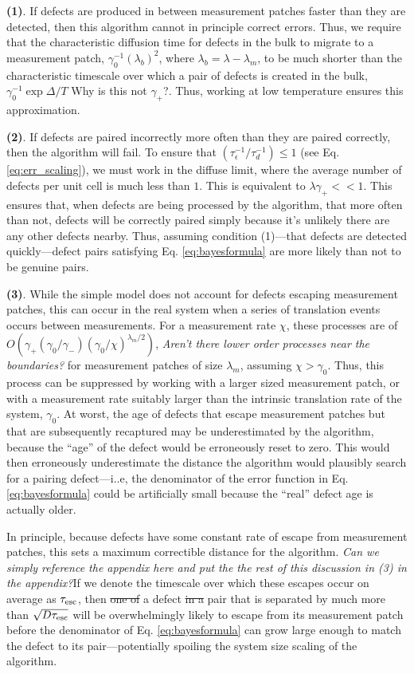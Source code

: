 \documentclass[twocolumn,superscriptaddress,aps,prb,floatfix]{revtex4-1}
\newcommand{\te}{\tau_{\rm{esc}}}
\newcommand{\CMH}[1]{{\color{green} { #1}}}
\newcommand{\MS}[1]{{\color{mauve} {#1}}}
\begin{document}
 \textbf{(1)}. If defects are produced in between measurement patches faster than they are detected, then this algorithm cannot in principle correct errors.  Thus, we require that the characteristic diffusion time for defects in the bulk to migrate to a measurement patch, $\gamma_0^{-1}(\lambda_b)^2$, \MS{where $\lambda_b=\lambda-\lambda_m$}, to be much shorter than the characteristic timescale over which a pair of defects is created in the bulk, $\gamma_0^{-1} \exp{\Delta/T}$ \MS{Why is this not $\gamma_+$?}.  Thus, working at low temperature ensures this approximation.
 
 \textbf{(2)}. If defects are paired incorrectly more often than they are paired correctly, then the algorithm will fail.  To ensure that $(\tau_{\epsilon}^{-1} / \tau_d^{-1})\leq1$ (see Eq. \ref{eq:err_scaling}), we must work in the diffuse limit, where the average number of defects per unit cell is much less than $1$.  This is equivalent to $\lambda \gamma_+<<1$.  This ensures that, when defects are being processed by the algorithm, that more often than not, defects will be correctly paired simply because it's unlikely there are any other defects nearby.  Thus, assuming condition (1)---that defects are detected quickly---defect pairs satisfying Eq. \ref{eq:bayesformula} are more likely than not to be genuine pairs. 
 
 \textbf{(3)}. While the simple model does not account for defects escaping measurement patches, this can occur in the real system when a series of translation events occurs between measurements.  For a measurement rate $\chi$, these processes are of $O(\gamma_+ (\gamma_0/\gamma_-) (\gamma_0/\chi)^{\lambda_m/2})$, \CMH{\it{Aren't there lower order processes near the boundaries?}} for measurement patches of size $\lambda_m$, assuming $\chi > \gamma_0$.  Thus, this process can be suppressed by working with a larger sized measurement patch, or with a measurement rate suitably larger than the intrinsic translation rate of the system, $\gamma_0$.  At worst, the age of defects that escape measurement patches but that are subsequently recaptured may be underestimated by the algorithm, because the ``age'' of the defect would be erroneously reset to zero.  This would then erroneously underestimate the distance the algorithm would plausibly search for a pairing defect---i..e, the denominator of the error function in Eq. \ref{eq:bayesformula} could be artificially small because the ``real'' defect age is actually older.

 In principle, because defects have some constant rate of escape from measurement patches, this sets a maximum correctible distance for the algorithm.  \CMH{\it{Can we simply reference the appendix here and put the the rest of this discussion in (3) in the appendix?}}If we denote the timescale over which these escapes occur on average as $\te$, then \MS{\sout{one of}} a defect \MS{\sout{in a}} pair that is separated by much more than $\sqrt{D \te}$ will be overwhelmingly likely to escape from its measurement patch before the denominator of Eq. \eqref{eq:bayesformula} can grow large enough to match the defect to its pair---potentially spoiling the system size scaling of the algorithm.
 
\end{document}
